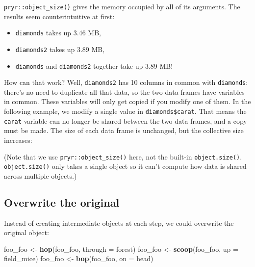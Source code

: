 \documentclass[]{book}
\newenvironment{Shaded}{\begin{snugshade}}{\end{snugshade}}
\newcommand{\KeywordTok}[1]{\textcolor[rgb]{0.13,0.29,0.53}{\textbf{{#1}}}}
\newcommand{\DataTypeTok}[1]{\textcolor[rgb]{0.13,0.29,0.53}{{#1}}}
\newcommand{\DecValTok}[1]{\textcolor[rgb]{0.00,0.00,0.81}{{#1}}}
\newcommand{\StringTok}[1]{\textcolor[rgb]{0.31,0.60,0.02}{{#1}}}
\newcommand{\CommentTok}[1]{\textcolor[rgb]{0.56,0.35,0.01}{\textit{{#1}}}}
\newcommand{\OtherTok}[1]{\textcolor[rgb]{0.56,0.35,0.01}{{#1}}}
\newcommand{\NormalTok}[1]{{#1}}
\providecommand{\tightlist}{%
  \setlength{\itemsep}{0pt}\setlength{\parskip}{0pt}}
\begin{document}
\texttt{pryr::object\_size()} gives the memory occupied by all of its
arguments. The results seem counterintuitive at first:

\begin{itemize}
\tightlist
\item
  \texttt{diamonds} takes up 3.46 MB,
\item
  \texttt{diamonds2} takes up 3.89 MB,
\item
  \texttt{diamonds} and \texttt{diamonds2} together take up 3.89 MB!
\end{itemize}

How can that work? Well, \texttt{diamonds2} has 10 columns in common
with \texttt{diamonds}: there's no need to duplicate all that data, so
the two data frames have variables in common. These variables will only
get copied if you modify one of them. In the following example, we
modify a single value in \texttt{diamonds\$carat}. That means the
\texttt{carat} variable can no longer be shared between the two data
frames, and a copy must be made. The size of each data frame is
unchanged, but the collective size increases:

\begin{Shaded}
\end{Shaded}

(Note that we use \texttt{pryr::object\_size()} here, not the built-in
\texttt{object.size()}. \texttt{object.size()} only takes a single
object so it can't compute how data is shared across multiple objects.)

\subsection{Overwrite the original}\label{overwrite-the-original}

Instead of creating intermediate objects at each step, we could
overwrite the original object:

\begin{Shaded}
\begin{Highlighting}[]
\NormalTok{foo_foo <-}\StringTok{ }\KeywordTok{hop}\NormalTok{(foo_foo, }\DataTypeTok{through =} \NormalTok{forest)}
\NormalTok{foo_foo <-}\StringTok{ }\KeywordTok{scoop}\NormalTok{(foo_foo, }\DataTypeTok{up =} \NormalTok{field_mice)}
\NormalTok{foo_foo <-}\StringTok{ }\KeywordTok{bop}\NormalTok{(foo_foo, }\DataTypeTok{on =} \NormalTok{head)}
\end{Highlighting}
\end{Shaded}
\end{document}
